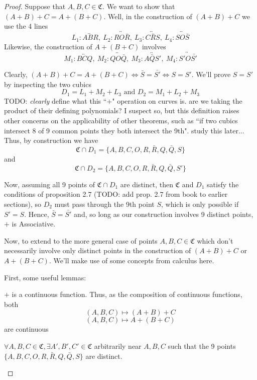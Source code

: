 \begin{proof}
Suppose that $A,B,C \in \mathfrak{C}$. We want to show that $(A+B)+C = A+(B+C)$.
Well, in the construction of $(A+B)+C$ we use the 4 lines
\[
L_1: \overleftrightarrow{ABR},~L_2: \overleftrightarrow{RO\bar{R}},~L_3: \overleftrightarrow{C\bar{R}S},~L_4: \overleftrightarrow{SO\bar{S}}
\]
Likewise, the construction of $A+(B+C)$ involves
\[
M_1: \overleftrightarrow{BCQ},~M_2: \overleftrightarrow{QO\bar{Q}},~M_3: \overleftrightarrow{A\bar{Q}S'},~M_4: \overleftrightarrow{S'O\bar{S'}}
\]

Clearly, $(A+B)+C = A+(B+C) \iff \bar{S}=\bar{S'} \iff S=S'$. We'll prove $S=S'$ by inspecting the two cubics
\[
	D_1 = L_1 + M_2 + L_3 \text{ and } D_2 = M_1 + L_2 + M_3
\]
TODO: \emph{clearly} define what this ``$+$" operation on curves is. are we
taking the product of their defining polynomials? I suspect so, but
this definition raises other concerns on the applicability of other theorems,
such as ``if two cubics intersect 8 of 9 common points they both intersect the 9th".
study this later...\\

Thus, by construction we have
\[
	\mathfrak{C} \cap D_1 = \{A, B, C, O, R, \bar{R}, Q, \bar{Q}, S\}
\]
and
\[
	\mathfrak{C} \cap D_2 = \{A, B, C, O, R, \bar{R}, Q, \bar{Q}, S'\}
\]

Now, assuming all 9 points of $\mathfrak{C} \cap D_1$ are distinct, then $\mathfrak{C}$ and $D_1$
satisfy the conditions of proposition 2.7 (TODO: add prop. 2.7 from book to earlier sections),
so $D_2$ must pass through the 9th point $S$, which is only possible if $S'=S$.
Hence, $\bar{S} = \bar{S'}$ and, so long as our construction involves 9 distinct points,
$+$ is Associative.

Now, to extend to the more general case of points $A,B,C \in \mathfrak{C}$
which don't necessarily involve only distinct points in the construction
of $(A+B)+C$ or $A+(B+C)$. We'll make use of some concepts from calculus here.

First, some useful lemmas:
\begin{lemma}
\label{lem:cubicgroupcts}
$+$ is a continuous function. Thus, as the composition of continuous functions, both
\[
(A,B,C) \mapsto (A+B)+C
\]
\[
(A,B,C) \mapsto A+(B+C)
\]
are continuous
\end{lemma}

\begin{lemma}
\label{lem:cubicgroupsequence}
$\forall A,B,C \in \mathfrak{C}, \exists A',B',C' \in \mathfrak{C}$ arbitrarily near $A,B,C$
such that the 9 points $\{A,B,C,O,R,\bar{R},Q,\bar{Q},S\}$ are distinct.


\end{lemma}
\end{proof}
